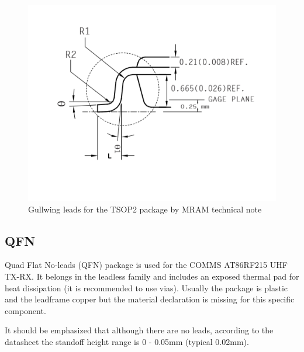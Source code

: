 \documentclass[final]{cubedoc}
\begin{document}
	\begin{figure}[h!]
		\centering
		\includegraphics[height=0.3\textheight, width=\textwidth, keepaspectratio]{docs/gullwing_leads_TSOP.png}
		\caption{Gullwing leads for the TSOP2 package by MRAM technical note}
		\label{fig:my_label}
	\end{figure}
	
	\subsection{QFN}
	
	
	Quad Flat No-leads (QFN) package is used for the COMMS AT86RF215 UHF TX-RX. It belongs in the leadless family and includes an exposed thermal pad for heat dissipation (it is recommended to use vias). Usually the package is plastic and the leadframe copper but the material declaration is missing for this specific component. 
	
	It should be emphasized that although there are no leads, according to the datasheet the standoff height range is 0 - 0.05mm (typical 0.02mm).
	
\end{document}

